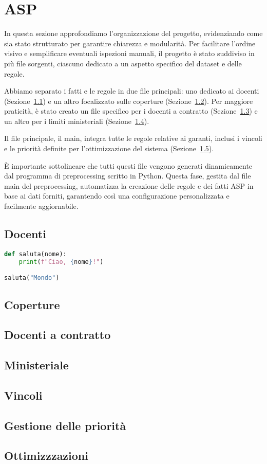\section{ASP}\label{sec:asp}

In questa sezione approfondiamo l'organizzazione del progetto, evidenziando 
come sia stato strutturato per garantire chiarezza e modularità. 
Per facilitare l'ordine visivo e semplificare eventuali ispezioni manuali, 
il progetto è stato suddiviso in più file sorgenti, ciascuno dedicato a un 
aspetto specifico del dataset e delle regole.

Abbiamo separato i fatti e le regole in due file principali: uno dedicato 
ai docenti (Sezione~\ref*{sec:rules-docenti}) e un altro focalizzato sulle 
coperture (Sezione~\ref*{sec:rules-coperture}). Per maggiore praticità, è 
stato creato un file specifico per i docenti a contratto 
(Sezione~\ref*{sec:rules-docenti-contratto}) e un altro per i limiti 
ministeriali (Sezione~\ref*{sec:rules-ministeriale}).

Il file principale, il main, integra tutte le regole relative ai garanti, 
inclusi i vincoli e le priorità definite per l'ottimizzazione del sistema 
(Sezione~\ref*{sec:constraints}).

È importante sottolineare che tutti questi file vengono generati dinamicamente 
dal programma di preprocessing scritto in Python. Questa fase, gestita dal 
file main del preprocessing, automatizza la creazione delle regole e dei 
fatti ASP in base ai dati forniti, garantendo così una configurazione 
personalizzata e facilmente aggiornabile. 


\subsection{Docenti}\label{sec:rules-docenti}



\begin{lstlisting}[language=Python, caption={Esempio di codice Python}]
def saluta(nome):
    print(f"Ciao, {nome}!")

saluta("Mondo")
\end{lstlisting}


\subsection{Coperture}\label{sec:rules-coperture}
\subsection{Docenti a contratto}\label{sec:rules-docenti-contratto}
\subsection{Ministeriale}\label{sec:rules-ministeriale}


\subsection{Vincoli}\label{sec:constraints}
\subsection{Gestione delle priorità}\label{sec:priorita}
\subsection{Ottimizzzazioni}\label{sec:optimizations}